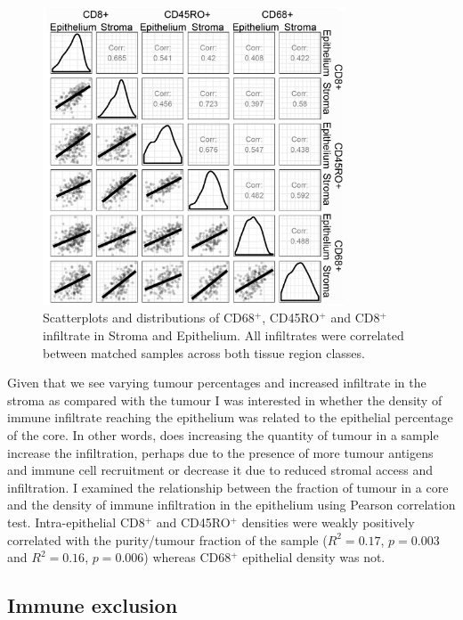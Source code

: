 \begin{figure}
    \centering
    \includegraphics[width=0.8\textwidth]{Chapter2/Figs/Raster/correlation_inf.png}
    \caption[Correlation between infiltrates]{Scatterplots and distributions of CD68$^+$, CD45RO$^+$ and CD8$^+$ infiltrate in Stroma and Epithelium. All infiltrates were correlated between matched samples across both tissue region classes.}
    \label{fig:ch2_correlation}
\end{figure}

Given that we see varying tumour percentages and increased infiltrate in the stroma as compared with the tumour I was interested in whether the density of immune infiltrate reaching the epithelium was related to the epithelial percentage of the core. In  other words, does increasing the quantity of tumour in a sample increase the infiltration, perhaps due to the presence of more tumour antigens and immune cell recruitment or decrease it due to reduced stromal access and infiltration. I examined the relationship between the fraction of tumour in a core and the density of immune infiltration in the epithelium using Pearson correlation test. Intra-epithelial CD8$^+$ and CD45RO$^+$ densities were  weakly positively correlated with the purity/tumour fraction of the sample ($R^2 = 0.17$, $p = 0.003$ and $R^2 = 0.16$, $p=0.006$) whereas CD68$^+$ epithelial density was not.



\subsection{Immune exclusion}

